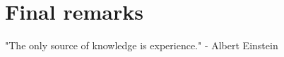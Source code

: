 \chapter{Final remarks}
\label{chapter:Final remarks}

\begin{introduction}
    "The only source of knowledge is experience." - Albert Einstein
\end{introduction}
